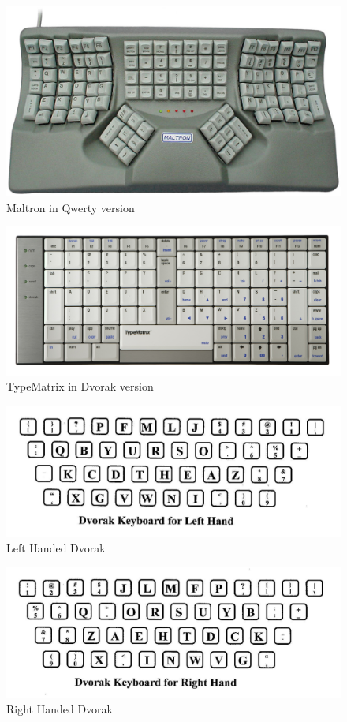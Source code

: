 \documentclass[MTech]{iitmdiss}
\begin{document}
\begin{figure}[h!]
	\centering
	\includegraphics[scale=3.4]{Images/maltron}
	\caption{Maltron in Qwerty version}
\end{figure}

\begin{figure}[h!]
	\centering
	\includegraphics[scale=0.16]{Images/typematrix}
	\caption{TypeMatrix in Dvorak version}
\end{figure}

\begin{figure}[h!]
	\centering
	\includegraphics[scale=0.35]{Images/dvorak_left_hand}
	\caption{Left Handed Dvorak}
\end{figure}

\begin{figure}[h!]
	\centering
	\includegraphics[scale=0.35]{Images/dvorak_right_hand}
	\caption{Right Handed Dvorak}
\end{figure}
\end{document}

